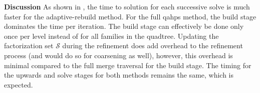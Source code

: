 {\bf Discussion}
As shown in , the time to solution for each successive solve is much faster for the adaptive-rebuild method. For the full \gls{qahps} method, the build stage dominates the time per iteration. The build stage can effectively be done only once per level instead of for all families in the quadtree. Updating the factorization set $\mathcal{S}$ during the refinement does add overhead to the refinement process (and would do so for coarsening as well), however, this overhead is minimal compared to the full merge traversal for the build stage. The timing for the upwards and solve stages for both methods remains the same, which is expected.


